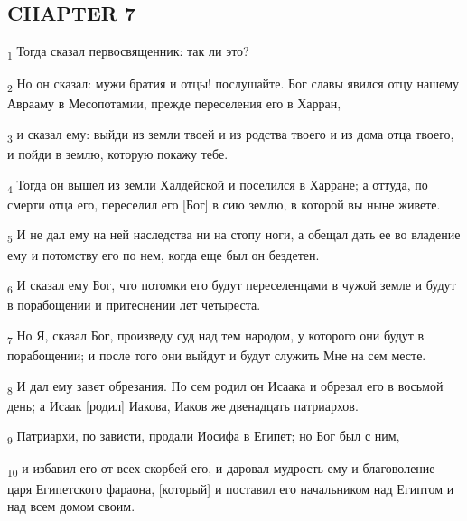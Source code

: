 \subsection{CHAPTER 7}
\begin{tcolorbox}
\textsubscript{1} Тогда сказал первосвященник: так ли это?
\end{tcolorbox}
\begin{tcolorbox}
\textsubscript{2} Но он сказал: мужи братия и отцы! послушайте. Бог славы явился отцу нашему Аврааму в Месопотамии, прежде переселения его в Харран,
\end{tcolorbox}
\begin{tcolorbox}
\textsubscript{3} и сказал ему: выйди из земли твоей и из родства твоего и из дома отца твоего, и пойди в землю, которую покажу тебе.
\end{tcolorbox}
\begin{tcolorbox}
\textsubscript{4} Тогда он вышел из земли Халдейской и поселился в Харране; а оттуда, по смерти отца его, переселил его [Бог] в сию землю, в которой вы ныне живете.
\end{tcolorbox}
\begin{tcolorbox}
\textsubscript{5} И не дал ему на ней наследства ни на стопу ноги, а обещал дать ее во владение ему и потомству его по нем, когда еще был он бездетен.
\end{tcolorbox}
\begin{tcolorbox}
\textsubscript{6} И сказал ему Бог, что потомки его будут переселенцами в чужой земле и будут в порабощении и притеснении лет четыреста.
\end{tcolorbox}
\begin{tcolorbox}
\textsubscript{7} Но Я, сказал Бог, произведу суд над тем народом, у которого они будут в порабощении; и после того они выйдут и будут служить Мне на сем месте.
\end{tcolorbox}
\begin{tcolorbox}
\textsubscript{8} И дал ему завет обрезания. По сем родил он Исаака и обрезал его в восьмой день; а Исаак [родил] Иакова, Иаков же двенадцать патриархов.
\end{tcolorbox}
\begin{tcolorbox}
\textsubscript{9} Патриархи, по зависти, продали Иосифа в Египет; но Бог был с ним,
\end{tcolorbox}
\begin{tcolorbox}
\textsubscript{10} и избавил его от всех скорбей его, и даровал мудрость ему и благоволение царя Египетского фараона, [который] и поставил его начальником над Египтом и над всем домом своим.
\end{tcolorbox}
